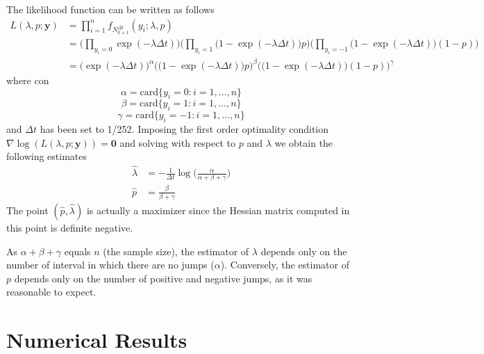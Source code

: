 The likelihood function can be written as follows
\begin{equation*}
\begin{split}
L(\lambda,p;\mathbf{y}) & = \prod_{i=1}^{n}f_{N^{\Delta t}_{k+1}}(y_i;\lambda,p)\\
& =\Big(\prod_{y_i = 0}\exp(-\lambda\Delta t) \Big)
\Big(\prod_{y_i=1}\big(1-\exp(-\lambda\Delta t) \big)p \Big)
\Big(\prod_{y_i=-1}\big(1-\exp(-\lambda\Delta t)\big)(1-p) \Big)\\
& = \Big(\exp(-\lambda\Delta t) \Big)^\alpha
\Big(\big(1-\exp(-\lambda\Delta t) \big)p \Big)^\beta
\Big(\big(1-\exp(-\lambda\Delta t)\big)(1-p) \Big)^\gamma
\end{split}
\end{equation*}
where 
con 
\[ \alpha =  \text{card}\{y_i = 0 \colon i = 1,\ldots,n\}\]
\[ \beta =  \text{card}\{y_i = 1 \colon i = 1,\ldots,n\}\]
\[ \gamma =  \text{card}\{y_i = -1 \colon i = 1,\ldots,n\}\]
and $\Delta t$ has been set to 1/252. Imposing the first order optimality condition $\nabla \log(L(\lambda,p;\mathbf{y}))=\bm{0}$
and solving with respect to $p$ and $\lambda$ we obtain the following estimates
\begin{align}
\widehat{\lambda} &= -\frac{1}{\Delta t}\log\Big(\frac{\alpha}{\alpha+\beta+\gamma}\Big)\\[2ex]
\widehat{p}& = \frac{\beta}{\beta+\gamma}
\end{align}
The point $(\widehat{p},\widehat{\lambda})$ is actually a maximizer since the Hessian matrix computed in this point is definite negative.
\begin{remark}
	As $\alpha+\beta+\gamma$ equals $n$ (the sample size), the estimator of $\lambda$ depends only on the number of interval in which there are no jumps ($\alpha$). Conversely, the estimator of $p$ depends only on the number of positive and negative jumps, as it was reasonable to expect.  
\end{remark}
\section{Numerical Results}



